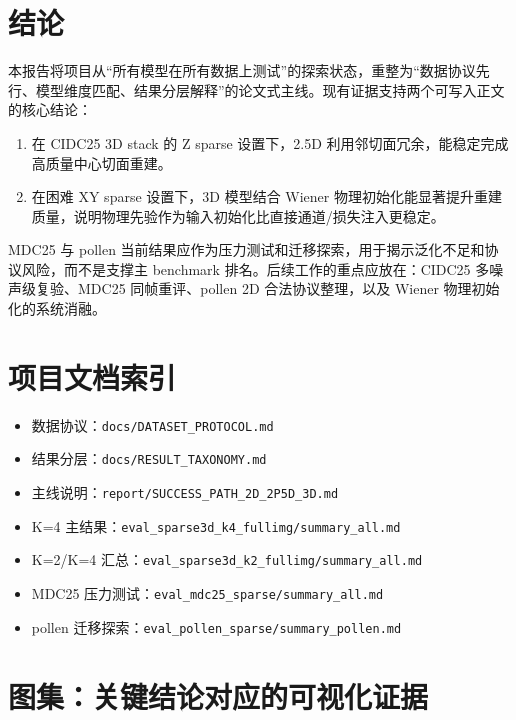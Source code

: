 \documentclass[UTF8, scheme=plain, 11pt, a4paper]{ctexart}
\begin{document}
\section{结论}

本报告将项目从“所有模型在所有数据上测试”的探索状态，重整为“数据协议先行、模型维度匹配、结果分层解释”的论文式主线。现有证据支持两个可写入正文的核心结论：

\begin{enumerate}[leftmargin=*]
  \item 在 CIDC25 3D stack 的 Z sparse 设置下，2.5D 利用邻切面冗余，能稳定完成高质量中心切面重建。
  \item 在困难 XY sparse 设置下，3D 模型结合 Wiener 物理初始化能显著提升重建质量，说明物理先验作为输入初始化比直接通道/损失注入更稳定。
\end{enumerate}

MDC25 与 pollen 当前结果应作为压力测试和迁移探索，用于揭示泛化不足和协议风险，而不是支撑主 benchmark 排名。后续工作的重点应放在：CIDC25 多噪声级复验、MDC25 同帧重评、pollen 2D 合法协议整理，以及 Wiener 物理初始化的系统消融。

\appendix

\section{项目文档索引}

\begin{itemize}[leftmargin=*]
  \item 数据协议：\texttt{docs/DATASET\_PROTOCOL.md}
  \item 结果分层：\texttt{docs/RESULT\_TAXONOMY.md}
  \item 主线说明：\texttt{report/SUCCESS\_PATH\_2D\_2P5D\_3D.md}
  \item K=4 主结果：\texttt{eval\_sparse3d\_k4\_fullimg/summary\_all.md}
  \item K=2/K=4 汇总：\texttt{eval\_sparse3d\_k2\_fullimg/summary\_all.md}
  \item MDC25 压力测试：\texttt{eval\_mdc25\_sparse/summary\_all.md}
  \item pollen 迁移探索：\texttt{eval\_pollen\_sparse/summary\_pollen.md}
\end{itemize}

\section{图集：关键结论对应的可视化证据}
\label{app:figure_atlas}
\end{document}
